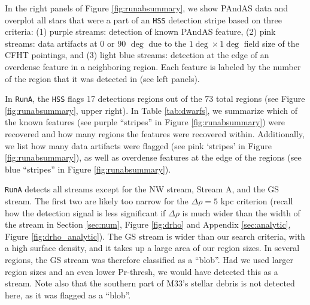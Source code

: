\documentclass[twocolumn]{aastex631}
\begin{document}
In the right panels of Figure \ref{fig:runabsummary}, we show PAndAS data and overplot all stars that were a part of an \texttt{HSS} detection stripe based on three criteria: (1) purple streams: detection of known PAndAS feature, (2) pink streams: data artifacts at 0 or 90 $\deg$ due to the $1\deg \times1\deg$ field size of the CFHT pointings, and (3) light blue streams: detection at the edge of an overdense feature in a neighboring region. Each feature is labeled by the number of the region that it was detected in (see left panels).

In \texttt{RunA}, the \texttt{HSS} flags 17 detections regions out of the 73 total regions (see Figure \ref{fig:runabsummary}, upper right). In Table \ref{tab:dwarfs}, we summarize which of the known features (see purple ``stripes'' in Figure \ref{fig:runabsummary}) were recovered and how many regions the features were recovered within. 
Additionally, we list how many data artifacts were flagged (see pink `stripes' in Figure \ref{fig:runabsummary}), as well as
overdense features at the edge of the regions (see blue ``stripes'' in Figure \ref{fig:runabsummary}).

\texttt{RunA} detects all streams except for the NW stream, Stream A, and the GS stream. The first two are likely too narrow for the $\Delta \rho = 5$ kpc criterion (recall how the detection signal is less significant if $\Delta\rho$ is much wider than the width of the stream in Section \ref{sec:num}, Figure \ref{fig:drho} and Appendix \ref{sec:analytic}, Figure \ref{fig:drho_analytic}). The GS stream is wider than our search criteria,  with a high surface density, and it takes up a large area of our region sizes. In several regions, the GS stream was therefore classified as a ``blob''. Had we used larger region sizes and an even lower Pr-thresh, we would have detected this as a stream.  Note also that the southern part of M33's stellar debris is not detected here, as it was flagged as a ``blob''. 
\end{document}
